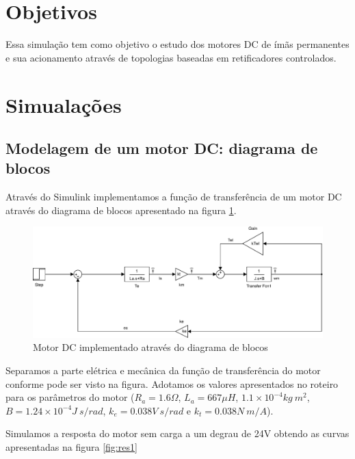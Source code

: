 \documentclass{article}
\begin{document}


\onehalfspacing
\section{Objetivos}
	Essa simulação tem como objetivo o estudo dos motores DC de ímãs permanentes e sua acionamento através de topologias baseadas em retificadores controlados.
	 
\section{Simualações}
\subsection{Modelagem de um motor DC: diagrama de blocos}
Através do Simulink implementamos a função de transferência de um motor DC através do diagrama de blocos apresentado na figura \ref{fig:sim1}.
\begin{figure}[H]
	\centering
	\includegraphics[width=\linewidth]{matlab/sim1}
	\caption{Motor DC implementado através do diagrama de blocos}
	\label{fig:sim1}
\end{figure}
Separamos a parte elétrica e mecânica da função de transferência do motor conforme pode ser visto na figura. Adotamos os valores apresentados no roteiro para os parâmetros do motor ($R_a = 1.6 \Omega$, $L_a = 667 \mu H$, $1.1 \times 10^{-4} kg\ m^2$, $B = 1.24 \times 10^{-4} J\ s/rad$, $k_e = 0.038 V\ s/rad$ e $k_t = 0.038 N\ m/A$).

Simulamos a resposta do motor sem carga a um degrau de 24V obtendo as curvas apresentadas na figura \ref{fig:res1}
\end{document}
